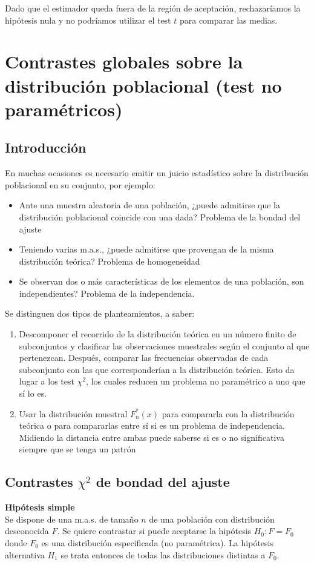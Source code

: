 \documentclass[a4paper,12pt]{article}
\begin{document}
    Dado que el estimador queda fuera de la región de aceptación, rechazaríamos la hipótesis nula y no podríamos utilizar el test $t$ para comparar las medias.
   

\section{Contrastes globales sobre la distribución poblacional (test no paramétricos)}

\subsection{Introducción}
En muchas ocasiones es necesario emitir un juicio estadístico sobre la distribución poblacional en su conjunto, por ejemplo:
\begin{itemize}
\item Ante una muestra aleatoria de una población, ¿puede admitirse que la distribución poblacional coincide con una dada? Problema de la bondad del ajuste
\item Teniendo varias m.a.s., ¿puede admitirse que provengan de la misma distribución teórica? Problema de homogeneidad
\item Se observan dos o más características de los elementos de una población, son independientes? Problema de la independencia.
\end{itemize}

Se distinguen dos tipos de planteamientos, a saber:
\begin{enumerate}
\item Descomponer el recorrido de la distribución teórica en un número finito de subconjuntos y clasificar las observaciones muestrales según el conjunto al que pertenezcan. Después, comparar las frecuencias observadas de cada subconjunto con las que corresponderían a la distribución teórica. Esto da lugar a los test $\chi^2$, los cuales reducen un problema no paramétrico a uno que sí lo es.
\item Usar la distribución muestral $F^*_n(x)$ para compararla con la distribución teórica o para compararlas entre sí si es un problema de independencia. Midiendo la distancia entre ambas puede saberse si es o no significativa siempre que se tenga un patrón
\end{enumerate}

\subsection{Contrastes $\chi^2$ de bondad del ajuste}
\textbf{Hipótesis simple} \\
Se dispone de una m.a.s. de tamaño $n$ de una población con distribución desconocida $F$. Se quiere contrastar si puede aceptarse la hipótesis $H_0 : F = F_0$ donde $F_0$ es una distribución especificada (no paramétrica). La hipótesis alternativa $H_1$ se trata entonces de todas las distribuciones distintas a $F_0$.
\end{document}
